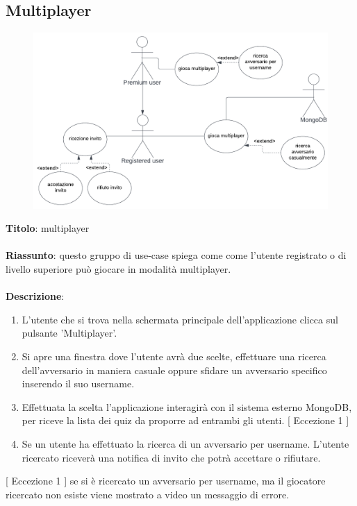 \newpage
\subsection{Multiplayer} \label{req_multiplayer}
\begin{figure}[!h]
\centering
\includegraphics[scale=0.35]{images/use_case_multiplayer.png}
\end{figure}
\noindent
\textbf{Titolo}: multiplayer \\
\\
\textbf{Riassunto}: questo gruppo di use-case spiega come come l'utente registrato o di livello superiore può giocare in modalità multiplayer.  \\
\\
\textbf{Descrizione}:
\begin{enumerate}
    \item L'utente che si trova nella schermata principale dell'applicazione clicca sul pulsante 'Multiplayer'.
    \item Si apre una finestra dove l'utente avrà due scelte, effettuare una ricerca dell'avversario in maniera casuale oppure sfidare un avversario specifico inserendo il suo username.
    \item Effettuata la scelta l'applicazione interagirà con il sistema esterno MongoDB, per riceve la lista dei quiz da proporre ad entrambi gli utenti. {[ Eccezione 1 ]}
    \item Se un utente ha effettuato la ricerca di un avversario per username. L'utente ricercato riceverà una notifica di invito che potrà accettare o rifiutare.
\end{enumerate}
{[ Eccezione 1 ]} se si è ricercato un avversario per username, ma il giocatore ricercato non esiste viene mostrato a video un messaggio di errore.


